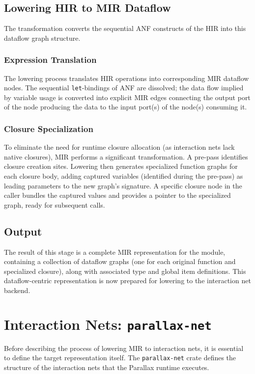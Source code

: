 \subsection{Lowering HIR to MIR Dataflow}

The transformation converts the sequential ANF constructs of the HIR into this dataflow graph structure.

\subsubsection{Expression Translation}
The lowering process translates HIR operations into corresponding MIR dataflow nodes. The sequential \texttt{let}-bindings of ANF are dissolved; the data flow implied by variable usage is converted into explicit MIR edges connecting the output port of the node producing the data to the input port(s) of the node(s) consuming it.

\subsubsection{Closure Specialization}
To eliminate the need for runtime closure allocation (as interaction nets lack native closures), MIR performs a significant transformation. A pre-pass identifies closure creation sites. Lowering then generates specialized function graphs for each closure body, adding captured variables (identified during the pre-pass) as leading parameters to the new graph's signature. A specific closure node in the caller bundles the captured values and provides a pointer to the specialized graph, ready for subsequent calls.

\subsection{Output}
The result of this stage is a complete MIR representation for the module, containing a collection of dataflow graphs (one for each original function and specialized closure), along with associated type and global item definitions. This dataflow-centric representation is now prepared for lowering to the interaction net backend.

\section{Interaction Nets: \texttt{parallax-net}}

Before describing the process of lowering MIR to interaction nets, it is essential to define the target representation itself. The \texttt{parallax-net} crate defines the structure of the interaction nets that the Parallax runtime executes.

